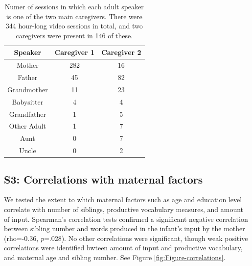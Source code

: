 \documentclass[
  man,mask,floatsintext]{apa6}
\begin{document}
\begin{longtable}[t]{ccc}
\caption{\label{tab:table-speakers-sessions}Numer of sessions in which each adult speaker is one of the two main caregivers. There were 344 hour-long video sessions in total, and two caregivers were present in 146 of these.}\\
\toprule
Speaker & Caregiver 1 & Caregiver 2\\
\midrule
Mother & 282 & 16\\
Father & 45 & 82\\
Grandmother & 11 & 23\\
Babysitter & 4 & 4\\
Grandfather & 1 & 5\\
\addlinespace
Other Adult & 1 & 7\\
Aunt & 0 & 7\\
Uncle & 0 & 2\\
\bottomrule
\end{longtable}

\newpage

\hypertarget{s3-correlations-with-maternal-factors}{%
\subsection{S3: Correlations with maternal factors}\label{s3-correlations-with-maternal-factors}}

We tested the extent to which maternal factors such as age and education level correlate with number of siblings, productive vocabulary measures, and amount of input. Spearman's correlation tests confirmed a significant negative correlation between sibling number and words produced in the infant's input by the mother (rho=-0.36, \emph{p}=.028). No other correlations were significant, though weak positive correlations were identified bwteen amount of input and productive vocabulary, and maternal age and sibling number. See Figure \ref{fig:Figure-correlations}.
\end{document}
